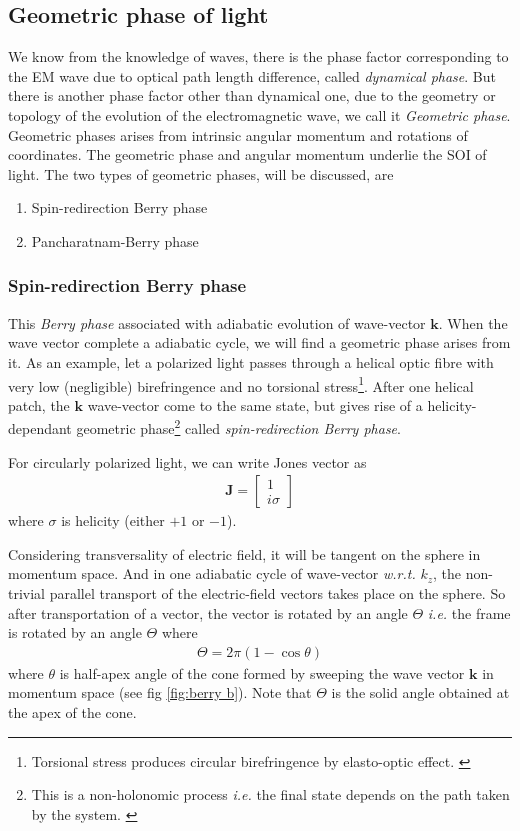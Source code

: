 \documentclass[11pt,a4paper]{article}
\numberwithin{equation}{section}
\begin{document}
\subsection{Geometric phase of light}
We know from the knowledge of waves, there is the phase factor corresponding to the EM wave due to optical path length difference, called \textit{dynamical phase}. But there is another phase factor other than dynamical one, due to the geometry or topology of the evolution of the electromagnetic wave, we call it \textit{Geometric phase}.\cite{WO} Geometric phases arises from intrinsic angular momentum and rotations of coordinates. The geometric phase and angular momentum underlie the SOI of light.\cite{bliokh 15} The two types of geometric phases, will be discussed, are
\begin{enumerate}
	\item Spin-redirection Berry phase
	\item Pancharatnam-Berry phase
\end{enumerate}

\subsubsection{Spin-redirection Berry phase}
This \textit{Berry phase} associated with adiabatic evolution of wave-vector $\boldsymbol{k}$. When the wave vector complete a adiabatic cycle, we will find a geometric phase arises from it.  As an example, let a polarized light passes through a helical optic fibre with very low (negligible) birefringence and no torsional stress\footnote{Torsional stress produces circular birefringence by elasto-optic effect. \cite{ross 84}}. After one helical patch, the $\boldsymbol{k}$ wave-vector come to the same state, but gives rise of a helicity-dependant geometric phase\footnote{This is a {non-holonomic process} \textit{i.e.} the final state depends on the path taken by the system. \cite{anholonomy}} called \textit{spin-redirection Berry phase}. \cite{bliokh 15}

For circularly polarized light, we can write Jones vector as 
\begin{align}
	\boldsymbol{J} = 
	\begin{bmatrix}
		1\\i\sigma
	\end{bmatrix}
\end{align}
where  $\sigma$ is helicity (either $+1$ or $-1$).

Considering transversality of electric field, it will be tangent on the sphere in momentum space. And in one adiabatic cycle of wave-vector \textit{w.r.t.} $k_z$, the non-trivial parallel transport of the electric-field vectors takes place on the sphere.\cite{bliokh 15} So after transportation of a vector, the vector is rotated by an angle $\Theta$ \cite{par trans} \textit{i.e.} the frame is rotated by an angle $\Theta$ where
\begin{align}
	\Theta = 2\pi(1-\cos\theta)
\end{align} where $\theta$ is half-apex angle of the cone formed by sweeping the wave vector $\boldsymbol{k}$ in momentum space (see fig \ref{fig:berry b}). Note that $\Theta$ is the solid angle obtained at the apex of the cone.
\end{document}
